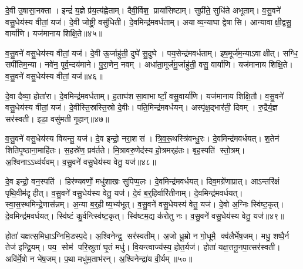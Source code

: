 दे॒वी उ॒षासा॒नक्ता। इन्द्रं॑ य॒ज्ञे प्र॑य॒त्य॑ह्वेताम्। दैवी॒र्विश॒ प्राया॑सिष्टाम्। सुप्री॑ते॒ सुधि॑ते अभूताम्। व॒सु॒वने॑ वसु॒धेय॑स्य वीतां॒ यज॑। दे॒वी जोष्ट्री॒ वसु॑धिती। दे॒वमिन्द्र॑मवर्धताम्। अयाव्य॒न्याघा द्वेषासि। आन्यावाक्षी॒द्वसु॒ वार्या॑णि। यज॑मानाय शिक्षि॒ते॥४५॥

व॒सु॒वने॑ वसु॒धेय॑स्य वीतां॒ यज॑। दे॒वी ऊ॒र्जाहु॑ती॒ दुघे॑ सु॒दुघे। पय॒सेन्द्र॑मवर्धताम्। इष॒मूर्ज॑म॒न्याऽवाक्षीत्। सग्धि॒ सपी॑तिम॒न्या। नवे॑न॒ पूर्व॒न्दय॑माने। पु॒रा॒णेन॒ नवम्। अधा॑ता॒मूर्ज॑मू॒र्जाहु॑ती॒ वसु॒ वार्या॑णि। यज॑मानाय शिक्षि॒ते। व॒सु॒वने॑ वसु॒धेय॑स्य वीतां॒ यज॑॥४६॥

दे॒वा दैव्या॒ होता॑रा। दे॒वमिन्द्र॑मवर्धताम्। ह॒ताघ॑शसा॒वाभार्ष्टां॒ वसु॒वार्या॑णि। यज॑मानाय शिक्षि॒तौ। व॒सु॒वने॑ वसु॒धेय॑स्य वीतां॒ यज॑। दे॒वीस्ति॒स्रस्ति॒स्रो दे॒वीः। पति॒मिन्द्र॑मवर्धयन्। अस्पृ॑क्ष॒द्भार॑ती॒ दिवम्। रु॒द्रैर्य॒ज्ञ सर॑स्वती। इडा॒ वसु॑मती गृ॒हान्॥४७॥

व॒सु॒वने॑ वसु॒धेय॑स्य वियन्तु॒ यज॑। दे॒व इन्द्रो॒ नरा॒शस॑। त्रि॒व॒रू॒थस्त्रि॑वन्धु॒रः। दे॒वमिन्द्र॑मवर्धयत्। श॒तेन॑ शितिपृ॒ष्ठाना॒माहि॑तः। स॒हस्रे॑ण॒ प्रव॑र्तते। मि॒त्रावरु॒णेद॑स्य हो॒त्रमर्‌ह॑तः। बृह॒स्पति॑ स्तो॒त्रम्। अ॒श्विनाऽऽध्व॑र्यवम्। व॒सु॒वने॑ वसु॒धेय॑स्य वेतु॒ यज॑॥४८॥

दे॒व इन्द्रो॒ वन॒स्पति॑। हिर॑ण्यवर्णो॒ मधु॑शाखः सुपिप्प॒लः। दे॒वमिन्द्र॑मवर्धयत्। दिव॒मग्रे॑णाप्रात्। आऽन्तरि॑क्षं पृथि॒वीम॑दृहीत्। व॒सु॒वने॑ वसु॒धेय॑स्य वेतु॒ यज॑। दे॒वं ब॒र्॒हिर्वारि॑तीनाम्। दे॒वमिन्द्र॑मवर्धयत्। स्वा॒स॒स्थमिन्द्रे॒णास॑न्नम्। अ॒न्या ब॒र्॒हीष्य॒भ्य॑भूत्। व॒सु॒वने॑ वसु॒धेयस्य॑ वेतु॒ यज॑। दे॒वो अ॒ग्निः स्वि॑ष्ट॒कृत्। दे॒वमिन्द्र॑मवर्धयत्। स्वि॑ष्टं कु॒र्वन्त्स्वि॑ष्ट॒कृत्। स्वि॑ष्टम॒द्य क॑रोतु नः। व॒सु॒वने॑ वसु॒धेय॑स्य वेतु॒ यज॑॥४९॥

होता॑ यक्षत्स॒मिधा॒ऽग्निमि॒डस्प॒दे। अ॒श्विनेन्द्र॒ सर॑स्वतीम्। अ॒जो धू॒म्रो न गो॒धूमै॒ क्व॑लैर्भेष॒जम्। मधु॒ शष्पै॒र्न तेज॑ इन्द्रि॒यम्। पय॒ सोम॑ परि॒स्रुता॑ घृ॒तं मधु॑। वि॒यन्त्वाज्य॑स्य॒ होत॒र्यज॑। होता॑ यक्ष॒त्तनू॒नपा॒त्सर॑स्वती। अवि॑र्मे॒षो न भे॑ष॒जम्। प॒था मधु॑म॒ताभ॑रन्। अ॒श्विनेन्द्रा॑य वी॒र्यम्॥५०॥

